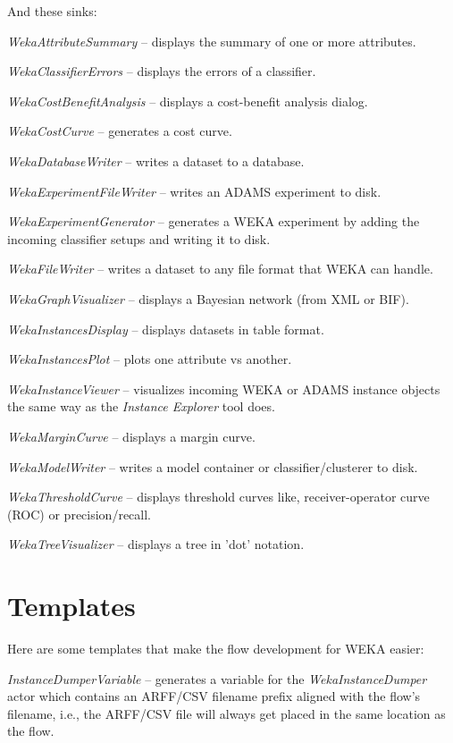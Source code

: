 And these sinks:
\begin{tight_itemize}
	\item \textit{WekaAttributeSummary} -- displays the summary of one or more attributes.
	\item \textit{WekaClassifierErrors} -- displays the errors of a classifier.
	\item \textit{WekaCostBenefitAnalysis} -- displays a cost-benefit analysis dialog.
	\item \textit{WekaCostCurve} -- generates a cost curve.
	\item \textit{WekaDatabaseWriter} -- writes a dataset to a database.
	\item \textit{WekaExperimentFileWriter} -- writes an ADAMS experiment to disk.
	\item \textit{WekaExperimentGenerator} -- generates a WEKA experiment by
	adding the incoming classifier setups and writing it to disk.
	\item \textit{WekaFileWriter} -- writes a dataset to any file format that
	WEKA can handle.
	\item \textit{WekaGraphVisualizer} -- displays a Bayesian network (from XML or BIF).
	\item \textit{WekaInstancesDisplay} -- displays datasets in table format.
	\item \textit{WekaInstancesPlot} -- plots one attribute vs another.
	\item \textit{WekaInstanceViewer} -- visualizes incoming WEKA or ADAMS
	instance objects the same way as the \textit{Instance Explorer} tool does.
	\item \textit{WekaMarginCurve} -- displays a margin curve.
	\item \textit{WekaModelWriter} -- writes a model container or
	classifier/clusterer to disk.
	\item \textit{WekaThresholdCurve} -- displays threshold curves like, 
	receiver-operator curve (ROC) or precision/recall.
	\item \textit{WekaTreeVisualizer} -- displays a tree in 'dot' notation.
\end{tight_itemize}

\section{Templates}
Here are some templates that make the flow development for WEKA easier:
\begin{tight_itemize}
	\item \textit{InstanceDumperVariable} -- generates a variable for the 
	\textit{WekaInstanceDumper} actor which contains an ARFF/CSV filename 
	prefix aligned with the flow's filename, i.e., the ARFF/CSV file will 
	always get placed in the same location as the flow.
\end{tight_itemize}
